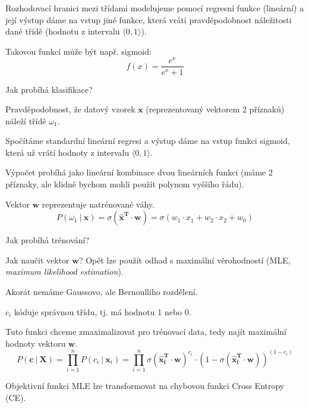 \begin{compactitem}
    \item Rozhodovací hranici mezi třídami modelujeme pomocí regresní funkce (lineární) a její výstup dáme na vstup jiné funkce, která vrátí pravděpodobnost náležitosti dané třídě (hodnotu z intervalu $\langle 0, 1 \rangle$). \begin{compactitem}
        \item Takovou funkcí může být např. sigmoid:
        $$ f(x) = \frac{e^x}{e^x + 1} $$
    \end{compactitem}

    \item Jak probíhá klasifikace? \begin{compactitem}
        \item Pravděpodobnost, že datový vzorek $\textbf{x}$ (reprezentovaný vektorem 2 příznaků) náleží třídě $\omega_1$.
        \item Spočítáme standardní lineární regresi a výstup dáme na vstup funkci sigmoid, která už vrátí hodnoty z intervalu $\langle 0, 1 \rangle$.
        \item Výpočet probíhá jako lineární kombinace dvou lineárních funkci (máme 2 příznaky, ale klidně bychom mohli použít polynom vyššího řádu).
        \item Vektor $\mathbf{w}$ reprezentuje natrénované váhy.
        $$ P(\omega_1 ~|~ \textbf{x}) = \sigma(\mathbf{\hat{x}^T} \cdot \mathbf{w}) = \sigma(w_1 \cdot x_1 + w_2 \cdot x_2 + w_0)$$
    \end{compactitem}

    \item Jak probíhá trénování? \begin{compactitem}
        \item Jak naučit vektor $\mathbf{w}$? Opět lze použít odhad s maximální věrohodností (MLE, \textit{maximum likelihood estimation}).

        \item Akorát nemáme Gaussovo, ale Bernoulliho rozdělení.

        \item $c_i$ kóduje správnou třídu, tj. má hodnotu 1 nebo 0.

        \item Tuto funkci chceme zmaximalizovat pro trénovací data, tedy najít maximální hodnoty vektoru $\mathbf{w}$.
        $$ P(\mathbf{c} ~|~ \mathbf{X}) = \prod_{i=1}^n P(c_i ~|~ \mathbf{x}_i) = \prod_{i=1}^n \sigma(\mathbf{\hat{x}_i^T} \cdot \mathbf{w})^{c_i} \cdot (1 - \sigma(\mathbf{\hat{x}_i^T} \cdot \mathbf{w}))^{(1 - c_i)}$$

        \item Objektivní funkci MLE lze transformovat na chybovou funkci Cross Entropy (CE).
    \end{compactitem}
\end{compactitem}

